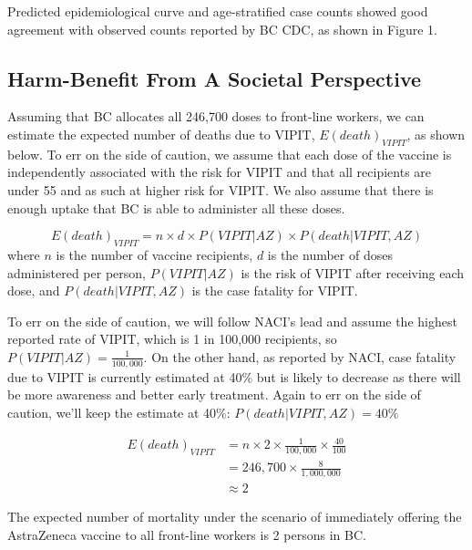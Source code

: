\documentclass[]{interact}
\theoremstyle{plain}%
\theoremstyle{definition}
\theoremstyle{remark}
\begin{document}
Predicted epidemiological curve and age-stratified case counts showed
good agreement with observed counts reported by BC CDC, as shown in
Figure 1.

\hypertarget{harm-benefit-from-a-societal-perspective}{%
\subsection{Harm-Benefit From A Societal
Perspective}\label{harm-benefit-from-a-societal-perspective}}

Assuming that BC allocates all 246,700 doses to front-line workers, we
can estimate the expected number of deaths due to VIPIT,
\(E(death)_{VIPIT}\), as shown below. To err on the side of caution, we
assume that each dose of the vaccine is independently associated with
the risk for VIPIT and that all recipients are under 55 and as such at
higher risk for VIPIT. We also assume that there is enough uptake that
BC is able to administer all these doses.

\[
E(death)_{VIPIT}  = n \times d \times P(VIPIT|AZ) \times P(death|VIPIT, AZ)
\] where \(n\) is the number of vaccine recipients, \(d\) is the number
of doses administered per person, \(P(VIPIT|AZ)\) is the risk of VIPIT
after receiving each dose, and \(P(death|VIPIT, AZ)\) is the case
fatality for VIPIT.

To err on the side of caution, we will follow NACI's lead and assume the
highest reported rate of VIPIT, which is 1 in 100,000 recipients, so
\(P(VIPIT|AZ) = \frac{1}{100,000}\). On the other hand, as reported by
NACI, case fatality due to VIPIT is currently estimated at 40\% but is
likely to decrease as there will be more awareness and better early
treatment. Again to err on the side of caution, we'll keep the estimate
at 40\%: \(P(death|VIPIT, AZ)=40\%\)

\[
\begin{aligned}
E(death)_{VIPIT} & = n \times 2 \times \frac{1}{100,000} \times \frac{40}{100} \\
& = 246,700 \times \frac{8}{1,000,000} \\
& \approx 2  
\end{aligned}
\]

The expected number of mortality under the scenario of immediately
offering the AstraZeneca vaccine to all front-line workers is 2 persons
in BC.
\end{document}
